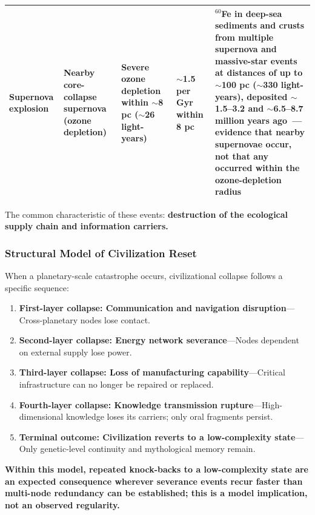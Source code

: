 \documentclass[aps,prd,twocolumn,superscriptaddress,nofootinbib]{revtex4-2}
\begin{document}
\begin{table}[htbp]
\begin{tabular}{P{0.108\textwidth}P{0.165\textwidth}P{0.140\textwidth}P{0.193\textwidth}P{0.241\textwidth}}
Supernova explosion & Nearby core-collapse supernova (ozone depletion) & Severe ozone depletion within ${\sim}$8 pc (${\sim}$26 light-years)~\cite{Gehrels2003} & ${\sim}$1.5 per Gyr within 8 pc~\cite{Gehrels2003} & ${}^{60}$Fe in deep-sea sediments and crusts from multiple supernova and massive-star events at distances of up to ${\sim}$100 pc (${\sim}$330 light-years), deposited ${\sim}$1.5--3.2 and ${\sim}$6.5--8.7 million years ago~\cite{Wallner2016}---evidence that nearby supernovae occur, not that any occurred within the ozone-depletion radius \\
\bottomrule
\end{tabular}
\end{table}

The common characteristic of these events: \textbf{destruction of the ecological supply chain and information carriers.}

\subsubsection{Structural Model of Civilization Reset}\label{sec:reset-model}

When a planetary-scale catastrophe occurs, civilizational collapse follows a specific sequence:

\begin{enumerate}
  \item \textbf{First-layer collapse: Communication and navigation disruption}---Cross-planetary nodes lose contact.
  \item \textbf{Second-layer collapse: Energy network severance}---Nodes dependent on external supply lose power.
  \item \textbf{Third-layer collapse: Loss of manufacturing capability}---Critical infrastructure can no longer be repaired or replaced.
  \item \textbf{Fourth-layer collapse: Knowledge transmission rupture}---High-dimensional knowledge loses its carriers; only oral fragments persist.
  \item \textbf{Terminal outcome: Civilization reverts to a low-complexity state}---Only genetic-level continuity and mythological memory remain.
\end{enumerate}

\textbf{Within this model, repeated knock-backs to a low-complexity state are an expected consequence wherever severance events recur faster than multi-node redundancy can be established; this is a model implication, not an observed regularity.}
\end{document}
